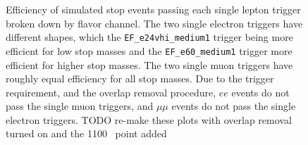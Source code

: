 \begin{figure}[ht]
  \centering
  \caption{Efficiency of simulated stop events passing each single lepton
    trigger broken down by flavor channel.
    The two single electron triggers have different shapes, which the 
    \texttt{EF\_e24vhi\_medium1} trigger being more efficient for low stop
    masses and the \texttt{EF\_e60\_medium1} trigger more efficient for
    higher stop masses.
    The two single muon triggers have roughly equal efficiency for all stop
    masses.
    Due to the trigger requirement, and the overlap removal procedure, $ee$
    events do not pass the single muon triggers, and $\mu\mu$ events do not
    pass the single electron triggers.
    {\color{red} TODO re-make these plots with overlap removal turned on and
    the 1100 \GeV\ point added}
  }
  \label{fig:single_trigger_efficiency}
\end{figure}

